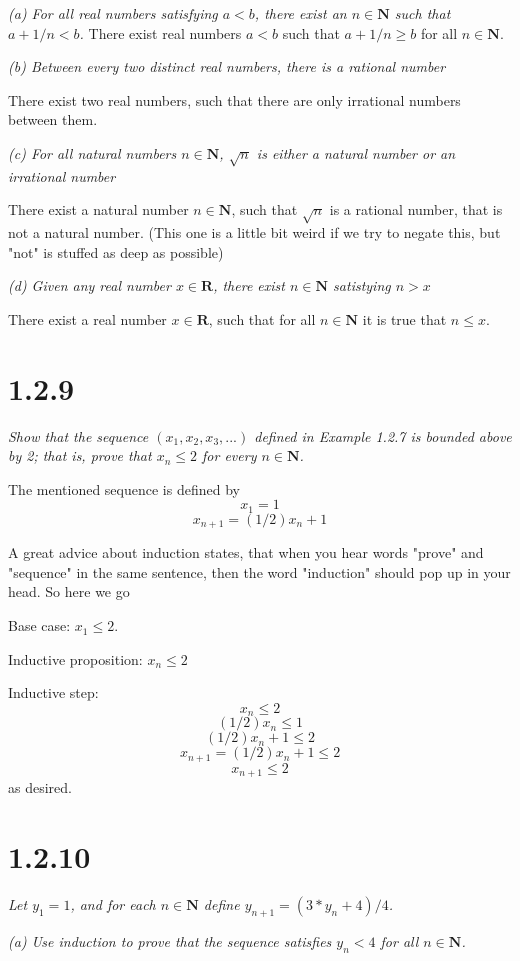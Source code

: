 \documentclass[11pt,oneside,titlepage]{book}
\begin{document}
\textit{(a) For all real numbers satisfying $a < b$, there exist an $n \in
  \textbf{N}$ such that $a + 1/n < b$.}
There exist real numbers $a < b$ such that $a + 1/n \geq b$ for all $n \in \textbf{N}$.

\textit{(b) Between every two distinct real numbers, there is a rational number}

There exist two real numbers, such that there are only irrational numbers
between them.

\textit{(c) For all natural numbers $n \in \textbf{N}$, $\sqrt{n}$ is either a
  natural number  or an irrational number}

There exist a natural number $n \in \textbf{N}$, such that $\sqrt{n}$ is a
rational number, that is not a natural number. (This one is a little bit weird
if we try to negate this, but "not" is stuffed as deep as possible)

\textit{(d) Given any real number $x \in \textbf{R}$, there exist $n \in
  \textbf{N}$ satistying $n > x$}

There exist a real number $x \in \textbf{R}$, such that
for all $n \in \textbf{N}$ it is true that $n \leq x$.

\section*{1.2.9}
\textit{Show that the sequence $(x_1, x_2, x_3,...)$ defined in Example 1.2.7
  is bounded above by 2; that is, prove that $x_n \leq 2$ for every $n \in
  \textbf{N}$.}

The mentioned sequence is defined by
$$x_1 = 1$$
$$x_{n + 1} = (1/2)x_n + 1$$

A great advice about induction states, that when you hear words "prove" and
"sequence" in the same sentence, then the word "induction" should pop up in
your head. So here we go

Base case: $x_1 \leq 2$.

Inductive proposition: $x_n \leq 2$

Inductive step:
$$x_n \leq 2$$
$$(1/2)x_n \leq 1$$
$$(1/2)x_n + 1 \leq 2$$
$$x_{n + 1} = (1/2)x_n + 1 \leq 2$$
$$x_{n + 1} \leq 2$$
as desired.

\section*{1.2.10}
\textit{Let $y_1 = 1$, and for each $n \in \textbf{N}$ define $y_{n + 1} =
  (3 * y_n + 4) / 4$.}

\textit{(a) Use induction to prove that the sequence satisfies $y_n < 4$ for
  all $n \in \textbf{N}$.}
\end{document}
